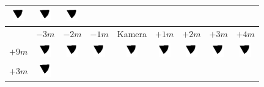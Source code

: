 \begin{tabular}{|c|c|c|c|c|c|c|c|c|}
	\includegraphics[width=0.5cm]{img_Bereich/V2_img_res_Winkel_Y_2000_3000.png}&
	\includegraphics[width=0.5cm]{img_Bereich/V2_img_res_Winkel_Y_3000_3000.png}&
	\includegraphics[width=0.5cm]{img_Bereich/V2_img_res_Winkel_Y_4000_3000.png}\\ 
	\hline 
	& $-3m$ & $-2m$ & $-1m$ &Kamera& $+1m$ & $+2m$ & $+3m$ & $+4m$ \\ 
	\hline
	\hline 
	$+9m$ &
	\includegraphics[width=0.5cm]{img_Bereich/V2_vid_res_Winkel_Y_-3000_9000.png}&
	\includegraphics[width=0.5cm]{img_Bereich/V2_vid_res_Winkel_Y_-2000_9000.png}&
	\includegraphics[width=0.5cm]{img_Bereich/V2_vid_res_Winkel_Y_-1000_9000.png}&
	\includegraphics[width=0.5cm]{img_Bereich/V2_vid_res_Winkel_Y_0_9000.png}&
	\includegraphics[width=0.5cm]{img_Bereich/V2_vid_res_Winkel_Y_1000_9000.png}&
	\includegraphics[width=0.5cm]{img_Bereich/V2_vid_res_Winkel_Y_2000_9000.png}&
	\includegraphics[width=0.5cm]{img_Bereich/V2_vid_res_Winkel_Y_3000_9000.png}&
	\includegraphics[width=0.5cm]{img_Bereich/V2_vid_res_Winkel_Y_4000_9000.png}\\ 
	\hline 
	$+3m$ &
	\includegraphics[width=0.5cm]{img_Bereich/V2_vid_res_Winkel_Y_-3000_3000.png}&

\end{tabular}
